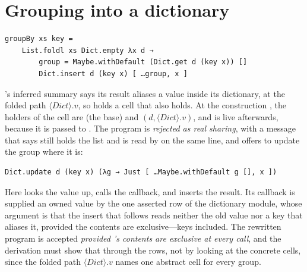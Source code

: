 \section{Grouping into a dictionary}
\label{app:groupby}

\begin{Verbatim}
groupBy xs key =
    List.foldl xs Dict.empty λx d →
        group = Maybe.withDefault (Dict.get d (key x)) []
        Dict.insert d (key x) [ …group, x ]
\end{Verbatim}
's inferred summary says its result aliases a value inside its dictionary, at the folded
path $\langle\mathit{Dict}\rangle.v$, so  holds a cell that  also holds. At the
construction \code{[ …group, x ]}, the holders of the cell are  (the base) and
$(d, \langle\mathit{Dict}\rangle.v)$, and  is live afterwards, because it is passed to
. The program is \emph{rejected as real sharing}, with a message that says  still
holds the list and is read by  on the same line, and offers to update the group where it
is:
\begin{Verbatim}
Dict.update d (key x) (λg → Just [ …Maybe.withDefault g [], x ])
\end{Verbatim}
Here  looks the value up, calls the
callback, and inserts the result. Its callback is supplied an owned value by the one asserted row of the
dictionary module, whose argument is that the insert that follows reads neither the old value nor a key
that aliases it, provided the contents are exclusive---keys included. The rewritten program is accepted
\emph{provided 's contents are exclusive at every call}, and the derivation must show that through
the rows, not by looking at the concrete cells, since the folded path $\langle\mathit{Dict}\rangle.v$ names
one abstract cell for every group.
